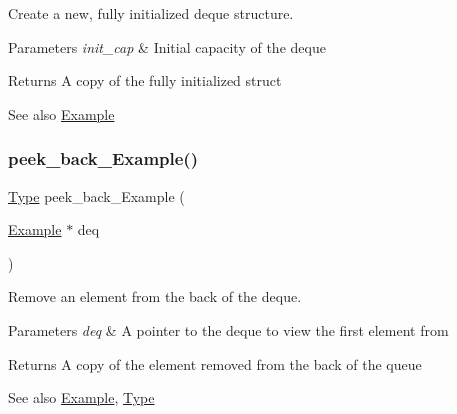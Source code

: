 Create a new, fully initialized deque structure. 


\begin{DoxyParams}{Parameters}
{\em init\+\_\+cap} & Initial capacity of the deque\\
\hline
\end{DoxyParams}
\begin{DoxyReturn}{Returns}
A copy of the fully initialized struct
\end{DoxyReturn}
\begin{DoxySeeAlso}{See also}
\hyperlink{structExample}{Example} 
\end{DoxySeeAlso}
\mbox{\label{group__DEQUE_ga17ee221f1873599af8849e47af1d490c}} 
\subsubsection{\texorpdfstring{peek\+\_\+back\+\_\+\+Example()}{peek\_back\_Example()}}
{\footnotesize\ttfamily \hyperlink{group__DEQUE_gac9c83c2070eb6b5891cf742b90f54c68}{Type} peek\+\_\+back\+\_\+\+Example (\begin{DoxyParamCaption}\item[{\hyperlink{structExample}{Example} $\ast$}]{deq }\end{DoxyParamCaption})}



Remove an element from the back of the deque. 


\begin{DoxyParams}{Parameters}
{\em deq} & A pointer to the deque to view the first element from\\
\hline
\end{DoxyParams}
\begin{DoxyReturn}{Returns}
A copy of the element removed from the back of the queue
\end{DoxyReturn}
\begin{DoxySeeAlso}{See also}
\hyperlink{structExample}{Example}, \hyperlink{group__DEQUE_gac9c83c2070eb6b5891cf742b90f54c68}{Type} 
\end{DoxySeeAlso}
\mbox{\label{group__DEQUE_gab65f67206d60592e7a12d4ed1c833cc1}} 
